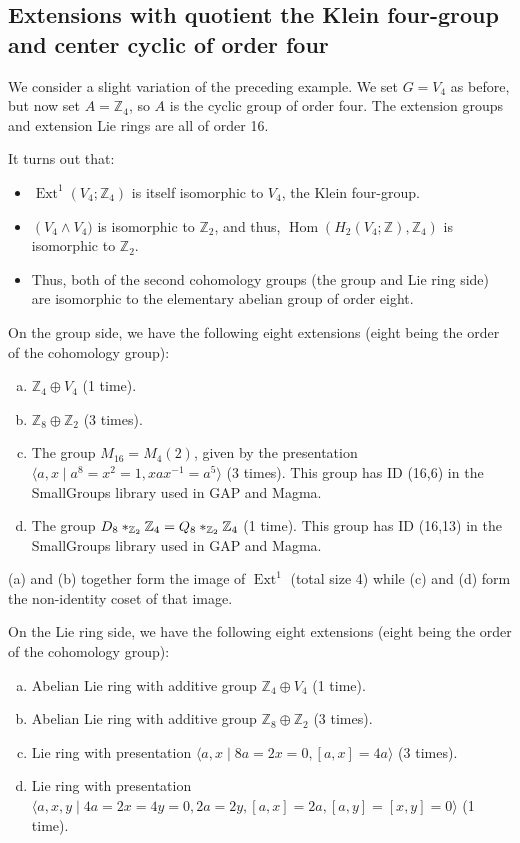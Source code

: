 \subsection{Extensions with quotient the Klein four-group and center cyclic of order four}

We consider a slight variation of the preceding example. We set $G =
V_4$ as before, but now set $A = \mathbb{Z}_4$, so $A$ is the cyclic
group of order four. The extension groups and extension Lie rings are
all of order 16.

It turns out that:

\begin{itemize}
\item $\operatorname{Ext}^1(V_4;\mathbb{Z}_4)$ is itself isomorphic to $V_4$, the Klein four-group.
\item $\operatorname(V_4 \wedge V_4)$ is isomorphic to $\mathbb{Z}_2$,
  and thus, $\operatorname{Hom}(H_2(V_4;\mathbb{Z}),\mathbb{Z}_4)$ is
  isomorphic to $\mathbb{Z}_2$.
\item Thus, both of the second cohomology groups (the group and Lie
  ring side) are isomorphic to the elementary abelian group of order
  eight.
\end{itemize}

On the group side, we have the following eight extensions (eight being
the order of the cohomology group):

\begin{enumerate}[(a)]
\item $\mathbb{Z}_4 \oplus V_4$ (1 time).
\item $\mathbb{Z}_8 \oplus \mathbb{Z}_2$ (3 times).
\item The group $M_{16} = M_4(2)$, given by the presentation $\langle
  a,x \mid a^8 = x^2 = 1, xax^{-1} = a^5 \rangle$ (3
  times). This group has ID (16,6) in the SmallGroups library
    used in GAP and Magma.
\item The group $D_8 *_{\mathbb{Z}_2} \mathbb{Z}_4 = Q_8 *_{\mathbb{Z}_2} \mathbb{Z}_4$ (1 time).
  This group has ID (16,13) in the SmallGroups library used in GAP and
  Magma.
\end{enumerate}

(a) and (b) together form the image of $\operatorname{Ext}^1$ (total
size 4) while (c) and (d) form the non-identity coset of that
image.

On the Lie ring side, we have the following eight extensions (eight
being the order of the cohomology group):

\begin{enumerate}[(a)]
\item Abelian Lie ring with additive group $\mathbb{Z}_4 \oplus V_4$
  (1 time).
\item Abelian Lie ring with additive group $\mathbb{Z}_8 \oplus
  \mathbb{Z}_2$ (3 times).
\item Lie ring with presentation $\langle
  a,x \mid 8a = 2x = 0, [a,x] = 4a \rangle$ (3
  times).
\item Lie ring with presentation $\langle a,x,y \mid 4a = 2x = 4y = 0,
  2a = 2y, [a,x] = 2a, [a,y] = [x,y] = 0 \rangle$ (1 time).
\end{enumerate}

